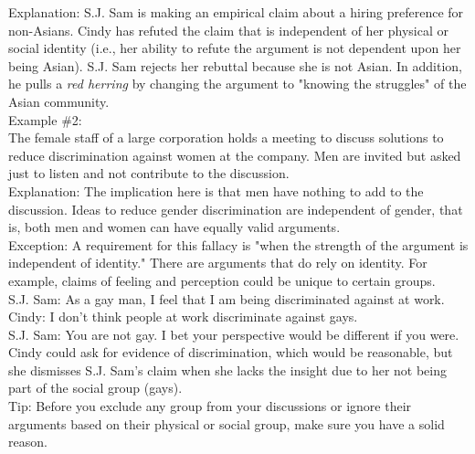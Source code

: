 \documentclass[a4paper,12pt,single,pdftex]{scrartcl}
\begin{document}
    
      Explanation: S.J. Sam is making an empirical claim about a hiring preference for non-Asians. Cindy has refuted the claim that is independent of her physical or social identity (i.e., her ability to refute the argument is not dependent upon her being Asian). S.J. Sam rejects her rebuttal because she is not Asian. In addition, he pulls a {\it red herring} by changing the argument to "knowing the struggles" of the Asian community.
    \\

    
      Example \#2:
    \\

    
      The female staff of a large corporation holds a meeting to discuss solutions to reduce discrimination against women at the company. Men are invited but asked just to listen and not contribute to the discussion.
    \\

    
      Explanation: The implication here is that men have nothing to add to the discussion. Ideas to reduce gender discrimination are independent of gender, that is, both men and women can have equally valid arguments.
    \\

    
      Exception: A requirement for this fallacy is "when the strength of the argument is independent of identity." There are arguments that do rely on identity. For example, claims of feeling and perception could be unique to certain groups.
    \\

    
      S.J. Sam: As a gay man, I feel that I am being discriminated against at work.
    \\

    
      Cindy: I don't think people at work discriminate against gays.
    \\

    
      S.J. Sam: You are not gay. I bet your perspective would be different if you were.
    \\

    
      Cindy could ask for evidence of discrimination, which would be reasonable, but she dismisses S.J. Sam's claim when she lacks the insight due to her not being part of the social group (gays).
    \\

    
      Tip: Before you exclude any group from your discussions or ignore their arguments based on their physical or social group, make sure you have a solid reason.
    \\
\end{document}
